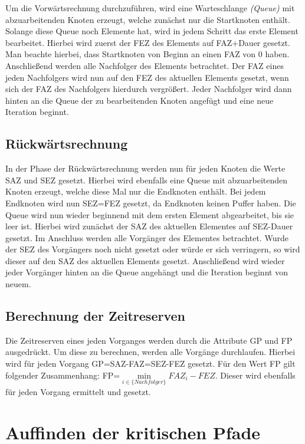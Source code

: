 Um die Vorw\"artsrechnung durchzuf\"uhren, wird eine Warteschlange
\textit{(Queue)} mit
abzuarbeitenden Knoten erzeugt, welche zun\"achst nur die Startknoten
enth\"alt. Solange diese Queue noch Elemente hat, wird in jedem
Schritt das erste Element bearbeitet. Hierbei wird zuerst der FEZ des
Elements auf
FAZ+Dauer gesetzt. Man beachte hierbei, dass Startknoten von Beginn an
einen FAZ von 0 haben. Anschlie{\ss}end werden alle Nachfolger
des Elements betrachtet. Der FAZ eines jeden Nachfolgers wird nun auf
den FEZ des aktuellen Elements gesetzt, wenn sich der FAZ des
Nachfolgers hierdurch vergr\"o{\ss}ert. Jeder Nachfolger wird dann hinten
an die Queue der zu bearbeitenden Knoten angef\"ugt und eine neue
Iteration beginnt.

\subsection{R\"uckw\"artsrechnung}

In der Phase der R\"uckw\"artsrechnung werden nun f\"ur jeden Knoten
die Werte SAZ und SEZ gesetzt. Hierbei wird ebenfalls
eine Queue mit abzuarbeitenden Knoten erzeugt, welche diese Mal nur
die Endknoten enth\"alt. Bei jedem Endknoten wird nun SEZ=FEZ gesetzt,
da Endknoten keinen Puffer haben. Die Queue wird nun wieder beginnend
mit dem ersten Element abgearbeitet, bis sie leer ist. Hierbei wird
zun\"achst der SAZ des aktuellen Elementes auf SEZ-Dauer gesetzt. Im
Anschluss werden alle Vorg\"anger des Elementes betrachtet. Wurde der
SEZ des Vorg\"angers noch nicht gesetzt oder w\"urde er sich
verringern, so wird dieser auf den SAZ des aktuellen Elements
gesetzt. Anschlie{\ss}end wird wieder jeder Vorg\"anger hinten an die
Queue angeh\"angt und die Iteration beginnt von neuem.

\subsection{Berechnung der Zeitreserven}

Die Zeitreserven eines jeden Vorganges werden durch die Attribute GP
und FP ausgedr\"uckt. Um diese zu berechnen, werden alle Vorg\"ange
durchlaufen. Hierbei wird f\"ur jeden Vorgang GP=SAZ-FAZ=SEZ-FEZ
gesetzt. F\"ur den Wert FP gilt folgender Zusammenhang:
FP=\(\min\limits_{i \in \{Nachfolger\}} FAZ_i - FEZ\). Dieser wird
ebenfalls f\"ur jeden Vorgang ermittelt und gesetzt.

\section{Auffinden der kritischen Pfade}

